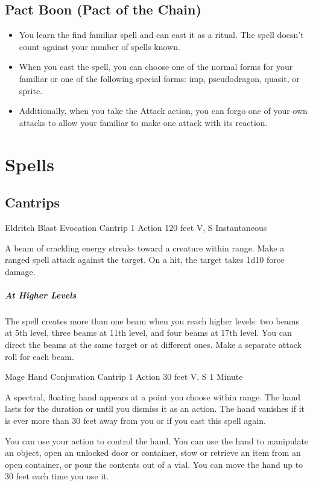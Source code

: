 {\subsection*{Pact Boon (Pact of the Chain)}
\begin{itemize}
	\item You learn the find familiar spell and can cast it as a ritual. The spell doesn't count against your number of spells known.
	\item When you cast the spell, you can choose one of the normal forms for your familiar or one of the following special forms: imp, pseudodragon, quasit, or sprite.
	\item Additionally, when you take the Attack action, you can forgo one of your own attacks to allow your familiar to make one attack with its reaction.
\end{itemize}

\section*{Spells}
\subsection*{Cantrips}

\DndSpellHeader
	{Eldritch Blast}
	{Evocation Cantrip}
	{1 Action}
	{120 feet}
	{V, S}
	{Instantaneous}

A beam of crackling energy streaks toward a creature within range. Make a ranged spell attack against the target. On a hit, the target takes 1d10 force damage.

\subparagraph*{At Higher Levels} The spell creates more than one beam when you reach higher levels: two beams at 5th level, three beams at 11th level, and four beams at 17th level. You can direct the beams at the same target or at different ones. Make a separate attack roll for each beam.

\DndSpellHeader
	{Mage Hand}
	{Conjuration Cantrip}
	{1 Action}
	{30 feet}
	{V, S}
	{1 Minute}

A spectral, floating hand appears at a point you choose within range. The hand lasts for the duration or until you dismiss it as an action. The hand vanishes if it is ever more than 30 feet away from you or if you cast this spell again.

You can use your action to control the hand. You can use the hand to manipulate an object, open an unlocked door or container, stow or retrieve an item from an open container, or pour the contents out of a vial. You can move the hand up to 30 feet each time you use it.

}
